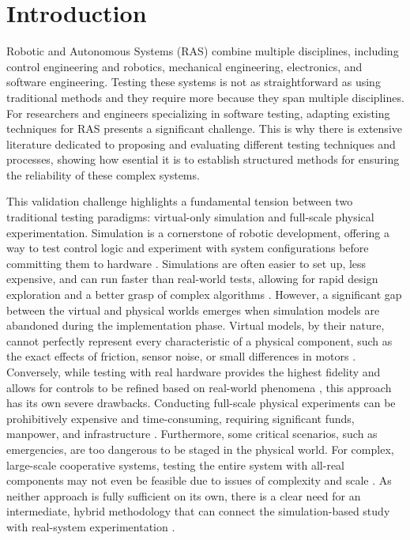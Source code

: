 \chapter{Introduction} \label{chap:introduction}

Robotic and Autonomous Systems (RAS) combine multiple disciplines, including control engineering and robotics, mechanical engineering, electronics, and software engineering.  Testing these systems is not as straightforward as using traditional methods and they require more because they span multiple disciplines. For researchers and engineers specializing in software testing, adapting existing techniques for RAS presents a significant challenge. This is why there is extensive literature dedicated to proposing and evaluating different testing techniques and processes, showing how esential it is to establish structured methods for ensuring the reliability of these complex systems. \cite{AMV23}

This validation challenge highlights a fundamental tension between two traditional testing paradigms: virtual-only simulation and full-scale physical experimentation. Simulation is a cornerstone of robotic development, offering a way to test control logic and experiment with system configurations before committing them to hardware \cite{Hu05, Mic04}. Simulations are often easier to set up, less expensive, and can run faster than real-world tests, allowing for rapid design exploration and a better grasp of complex algorithms \cite{Mic04, Dos17, BM18}. However, a significant gap between the virtual and physical worlds emerges when simulation models are abandoned during the implementation phase. Virtual models, by their nature, cannot perfectly represent every characteristic of a physical component, such as the exact effects of friction, sensor noise, or small differences in motors \cite{Hu05, BM18}. Conversely, while testing with real hardware provides the highest fidelity and allows for controls to be refined based on real-world phenomena \cite{Hu05, Cas21}, this approach has its own severe drawbacks. Conducting full-scale physical experiments can be prohibitively expensive and time-consuming, requiring significant funds, manpower, and infrastructure \cite{Hu05, Dos17, Mic04}. Furthermore, some critical scenarios, such as emergencies, are too dangerous to be staged in the physical world. For complex, large-scale cooperative systems, testing the entire system with all-real components may not even be feasible due to issues of complexity and scale \cite{Hu05}. As neither approach is fully sufficient on its own, there is a clear need for an intermediate, hybrid methodology that can connect the simulation-based study with real-system experimentation \cite{Hu05}.

